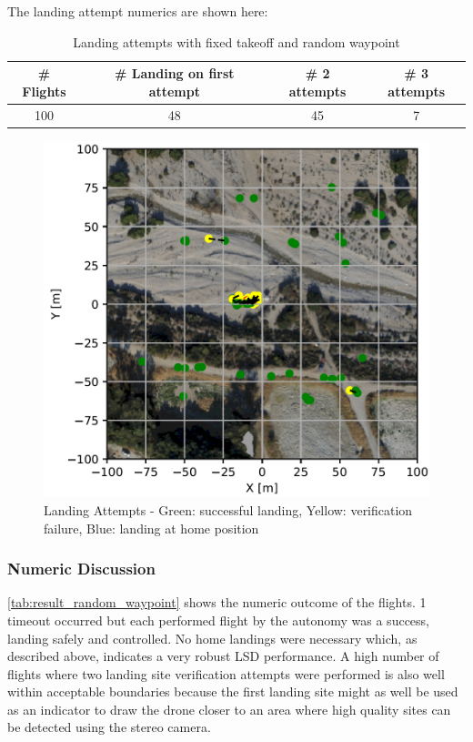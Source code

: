     The landing attempt numerics are shown here:
    \begin{table}[h]
        \begin{center}
         \caption{Landing attempts with fixed takeoff and random waypoint}\vspace{1ex}
         \label{tab:land_nums_random_waypoint}
         \begin{tabular}{|c|c|c|c|}
         \hline
         \# Flights & \# Landing on first attempt & \# 2 attempts & \# 3 attempts\\ \hline \hline
         100 & 48 & 45 & 7 \\
         \hline
         \end{tabular}
        \end{center}
    \end{table}

    \begin{figure}[h]
        \begin{center}
            \includegraphics[scale=0.5]{images/evaluation/landings_random_WP_GT.png}
            \caption{Landing Attempts - Green: successful landing, Yellow: verification failure, Blue: landing at home position}
            \label{fig:landing_attempts_random_WP}
        \end{center}
    \end{figure}

    \subsubsection{Numeric Discussion}
    \cref{tab:result_random_waypoint} shows the numeric outcome of the flights. 1 timeout occurred but each performed flight by the autonomy was a success, landing safely and controlled. No home landings were necessary which, as described above, indicates a very robust LSD performance. A high number of flights where two landing site verification attempts were performed is also well within acceptable boundaries because the first landing site might as well be used as an indicator to draw the drone closer to an area where high quality sites can be detected using the stereo camera.


